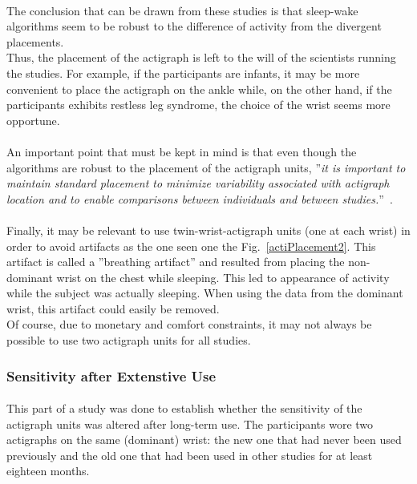 \documentclass[a4paper,12pt]{article}
\begin{document}
\paragraph{}
The conclusion that can be drawn from these studies is that sleep-wake algorithms seem to be robust to the difference of activity from the divergent placements. \\
Thus, the placement of the actigraph is left to the will of the scientists running the studies. For example, if the participants are infants, it may be more convenient to place the actigraph on the ankle while, on the other hand, if the participants exhibits restless leg syndrome, the choice of the wrist seems more opportune.

\paragraph{}
An important point that must be kept in mind is that even though the algorithms are robust to the placement of the actigraph units, ''\textit{it is important to maintain
standard placement to minimize variability associated with actigraph location and to enable comparisons between individuals and between studies.}''~\cite{Sadeh2005}.

\paragraph{}
Finally, it may be relevant to use twin-wrist-actigraph units (one at each wrist) in order to avoid artifacts as the one seen one the Fig.~\ref{actiPlacement2}. This artifact is called a ''breathing artifact'' and resulted from placing the non-dominant wrist on the chest while sleeping. This led to appearance of activity while the subject was actually sleeping. When using the data from the dominant wrist, this artifact could easily be removed.\\
Of course, due to monetary and comfort constraints, it may not always be possible to use two actigraph units for all studies.

\subsubsection{Sensitivity after Extenstive Use}

\paragraph{}
This part of a study was done to establish whether the sensitivity of the actigraph units was altered after long-term use. The participants wore two actigraphs on the same (dominant) wrist: the new one that had never been used previously and the old one that had been used in other studies for at least eighteen months.
\end{document}
